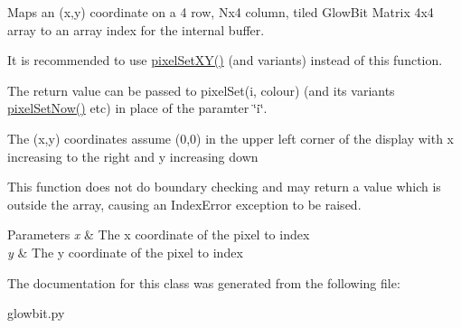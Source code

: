Maps an (x,y) coordinate on a 4 row, Nx4 column, tiled Glow\+Bit Matrix 4x4 array to an array index for the internal buffer. 

It is recommended to use \hyperlink{classglowbit_1_1glowbitMatrix_a5f20884e1b08bc66e54860d0bbf0d22e}{pixel\+Set\+X\+Y()} (and variants) instead of this function.

The return value can be passed to pixel\+Set(i, colour) (and its variants \hyperlink{classglowbit_1_1glowbit_a6f4167e566106d5eb104933b256f2e14}{pixel\+Set\+Now()} etc) in place of the paramter \char`\"{}i\char`\"{}.

The (x,y) coordinates assume (0,0) in the upper left corner of the display with x increasing to the right and y increasing down

This function does not do boundary checking and may return a value which is outside the array, causing an Index\+Error exception to be raised.


\begin{DoxyParams}{Parameters}
{\em x} & The x coordinate of the pixel to index \\
\hline
{\em y} & The y coordinate of the pixel to index \\
\hline
\end{DoxyParams}


The documentation for this class was generated from the following file\+:\begin{DoxyCompactItemize}
\item 
glowbit.\+py\end{DoxyCompactItemize}
